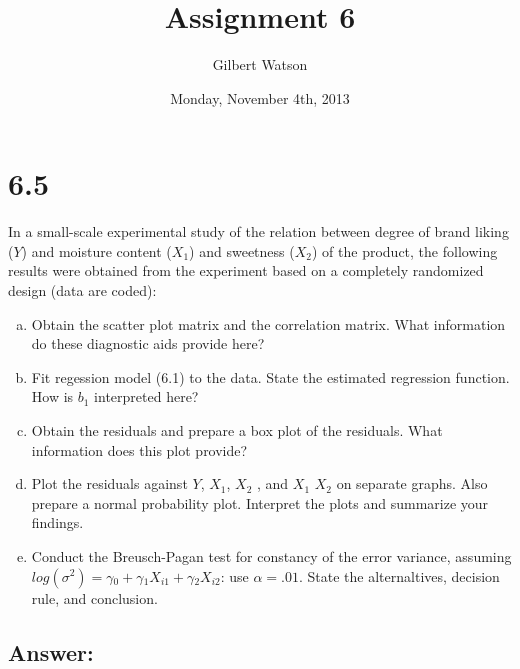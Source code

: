 \documentclass{article}
\begin{document}


\title{Assignment 6}
\author{Gilbert Watson}
\date{Monday, November 4th, 2013}





\maketitle
\tableofcontents

\section{6.5}

In a small-scale experimental study of the relation between degree of brand liking ($Y$) and moisture content ($X_1$) and sweetness ($X_2$) of the product, the following results were obtained from the experiment based on a completely randomized design (data are coded):

\begin{enumerate}[a)]
\item{} Obtain the scatter plot matrix and the correlation matrix. What information do these diagnostic aids provide here?
\item{} Fit regession model (6.1) to the data. State the estimated regression function. How is $b_1$ interpreted here?
\item{} Obtain the residuals and prepare a box plot of the residuals. What information does this plot provide?
\item{} Plot the residuals against $Y$, $X_1$, $X_2$ , and $X_1$ $X_2$ on separate graphs. Also prepare a normal probability plot. Interpret the plots and summarize your findings.
\item{} Conduct the Breusch-Pagan test for constancy of the error variance, assuming $log(\sigma{}^2) = \gamma{}_0 + \gamma{}_1X_{i1} + \gamma{}_2X_{i2}$: use $\alpha{} = .01$. State the alternaltives, decision rule, and conclusion.
\end{enumerate}

\subsection{Answer:}
\end{document}
